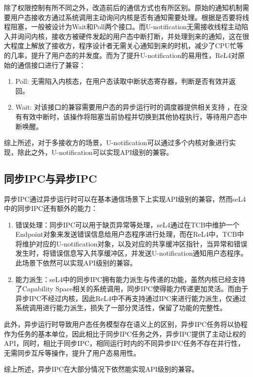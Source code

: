 除了权限控制有所不同之外，改造前后的通信方式也有所区别。原始的通知机制需要用户态接收方通过系统调用主动询问内核是否有通知需要处理。根据是否要将线程阻塞，一般被设计为Wait和Poll两个接口。而U-notification无需接收线程主动陷入并询问内核，接收方被硬件发起的用户态中断打断，并处理到来的通知，这在很大程度上解放了接收方，程序设计者无需关心通知到来的时机，减少了CPU忙等的几率，提升了用户态的并发度。而为了提升U-notification的易用性，ReL4对原始的通信接口进行了兼容：
\begin{enumerate}
  \item Poll: 无需陷入内核态，在用户态读取中断状态寄存器，判断是否有效并返回。
  \item Wait: 对该接口的兼容需要用户态的异步运行时的调度器提供相关支持	，在没有有效中断时，该操作将阻塞当前协程并切换到其他协程执行，等待用户态中断唤醒。
\end{enumerate}

综上所述，对于多接收方的场景，U-notification可以通过多个内核对象进行实现，除此之外，U-notification可以实现API级别的兼容。

\subsection{同步IPC与异步IPC}

异步IPC通过异步运行时可以在基本通信场景下上实现API级别的兼容，然而seL4中的同步IPC还有额外的能力：
\begin{enumerate}
  \item 错误处理：同步IPC可以用于缺页异常等处理，seL4通过在TCB中维护一个Endpoint对象来发送错误信息给用户态程序进行处理，而在ReL4中，TCB中将维护对应的U-notification对象，以及对应的共享缓冲区指针，当异常和错误发生时，将错误信息写入共享缓冲区，并发送U-notification通知用户态程序。此场景下依然可以实现API级别的兼容。
  \item 能力派生：seL4中的同步IPC拥有能力派生与传递的功能，虽然内核已经支持了Capability Space相关的系统调用，同步IPC使得能力传递更加灵活。而由于异步IPC不经过内核，因此ReL4中不再支持通过IPC来进行能力派生，仅通过系统调用进行能力派生，损失了一部分灵活性，保留了功能的完整性。
\end{enumerate}

此外，异步运行时导致用户态任务模型存在语义上的区别，异步IPC任务将以协程作为任务的基本单位，因此相比于同步IPC任务之外，异步IPC提供了主动让权的API，同时，相比于同步IPC，相同运行时内的不同异步IPC任务不存在并行性，无需同步互斥等操作，提升了用户态易用性。

综上所述，异步IPC在大部分情况下依然能实现API级别的兼容。

